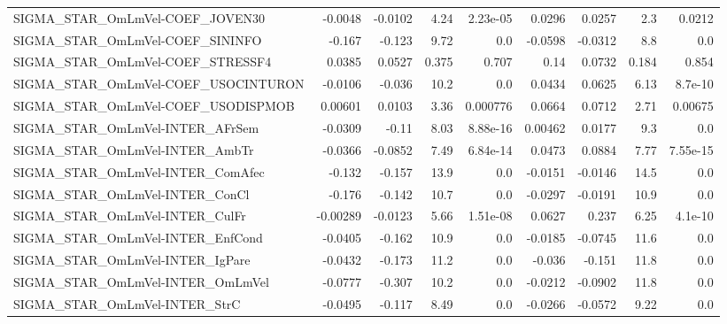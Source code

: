 \begin{tabular}{lrrrrrrrr}
SIGMA\_STAR\_OmLmVel-COEF\_JOVEN30        &     -0.0048 &      -0.0102 &    4.24 & 2.23e-05 &     0.0296 &      0.0257 &          2.3 &        0.0212 \\
SIGMA\_STAR\_OmLmVel-COEF\_SININFO        &      -0.167 &       -0.123 &    9.72 &      0.0 &    -0.0598 &     -0.0312 &          8.8 &           0.0 \\
SIGMA\_STAR\_OmLmVel-COEF\_STRESSF4       &      0.0385 &       0.0527 &   0.375 &    0.707 &       0.14 &      0.0732 &        0.184 &         0.854 \\
SIGMA\_STAR\_OmLmVel-COEF\_USOCINTURON    &     -0.0106 &       -0.036 &    10.2 &      0.0 &     0.0434 &      0.0625 &         6.13 &       8.7e-10 \\
SIGMA\_STAR\_OmLmVel-COEF\_USODISPMOB     &     0.00601 &       0.0103 &    3.36 & 0.000776 &     0.0664 &      0.0712 &         2.71 &       0.00675 \\
SIGMA\_STAR\_OmLmVel-INTER\_AFrSem        &     -0.0309 &        -0.11 &    8.03 & 8.88e-16 &    0.00462 &      0.0177 &          9.3 &           0.0 \\
SIGMA\_STAR\_OmLmVel-INTER\_AmbTr         &     -0.0366 &      -0.0852 &    7.49 & 6.84e-14 &     0.0473 &      0.0884 &         7.77 &      7.55e-15 \\
SIGMA\_STAR\_OmLmVel-INTER\_ComAfec       &      -0.132 &       -0.157 &    13.9 &      0.0 &    -0.0151 &     -0.0146 &         14.5 &           0.0 \\
SIGMA\_STAR\_OmLmVel-INTER\_ConCl         &      -0.176 &       -0.142 &    10.7 &      0.0 &    -0.0297 &     -0.0191 &         10.9 &           0.0 \\
SIGMA\_STAR\_OmLmVel-INTER\_CulFr         &    -0.00289 &      -0.0123 &    5.66 & 1.51e-08 &     0.0627 &       0.237 &         6.25 &       4.1e-10 \\
SIGMA\_STAR\_OmLmVel-INTER\_EnfCond       &     -0.0405 &       -0.162 &    10.9 &      0.0 &    -0.0185 &     -0.0745 &         11.6 &           0.0 \\
SIGMA\_STAR\_OmLmVel-INTER\_IgPare        &     -0.0432 &       -0.173 &    11.2 &      0.0 &     -0.036 &      -0.151 &         11.8 &           0.0 \\
SIGMA\_STAR\_OmLmVel-INTER\_OmLmVel       &     -0.0777 &       -0.307 &    10.2 &      0.0 &    -0.0212 &     -0.0902 &         11.8 &           0.0 \\
SIGMA\_STAR\_OmLmVel-INTER\_StrC          &     -0.0495 &       -0.117 &    8.49 &      0.0 &    -0.0266 &     -0.0572 &         9.22 &           0.0 \\

\end{tabular}
